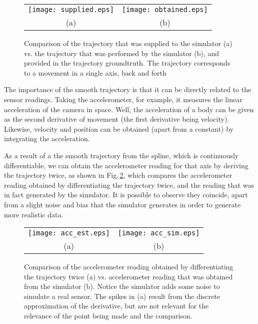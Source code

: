 \begin{figure}[ht]
	\centering
		\begin{tabular}{cc}
		   \texttt{[image: supplied.eps]} &
		   \hspace{1cm} \texttt{[image: obtained.eps]} \\
		   (a) & (b)  \\
		\end{tabular}
	\caption[Trajectory obtained through simulator and provided trajectory]{Comparison of the trajectory that was supplied to the simulator (a) vs. the trajectory that was performed by the simulator (b), and provided in the trajectory groundtruth. The trajectory corresponds to a movement in a single axis, back and forth}
	\label{fig:sec2_traj_sup_ob}
\end{figure}


The importance of the smooth trajectory is that it can be directly related to the sensor readings. Taking the accelerometer, for example, it measures the linear acceleration of the camera in space. Well, the acceleration of a body can be given as the second derivative of movement (the first derivative being velocity). Likewise, velocity and position can be obtained (apart from a constant) by integrating the acceleration. 

As a result of a the smooth trajectory from the spline, which is continuously differentiable, we can obtain the accelerometer reading for that axis by deriving the trajectory twice, as shown in Fig.\,\ref{fig:sec2_comp_imu}, which compares the accelerometer reading obtained by differentiating the trajectory twice, and the reading that was in fact generated by the simulator. It is possible to observe they coincide, apart from a slight noise and bias that the simulator generates in order to generate more realistic data.

\begin{figure}[ht]
	\centering
		\begin{tabular}{cc}
		   \texttt{[image: acc\_est.eps]} &
		   \hspace{1cm} \texttt{[image: acc\_sim.eps]} \\
		   (a) & (b)  \\
		\end{tabular}
	\caption[Comparison of sensor readings provided by simulator and the second derivative of the trajectory]{Comparison of the accelerometer reading obtained by differentiating the trajectory twice (a) vs. accelerometer reading that was obtained from the simulator (b). Notice the simulator adds some noise to simulate a real sensor. The spikes in (a) result from the discrete approximation of the derivative, but are not relevant for the relevance of the point being made and the comparison.}
	\label{fig:sec2_comp_imu}
\end{figure}

